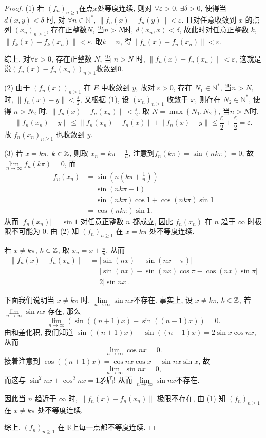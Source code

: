 \begin{proof}
    (1) 若 $(f_n)_{n\geq 1}$在点$x$处等度连续, 则对 $\forall \varepsilon>0$, $\exists \delta>0$, 
    使得当 $d(x,y)<\delta$ 时, 对 $\forall n\in\mathbb{N}^*$, $\|f_n(x)-f_n(y)\|<\varepsilon$. 
    且对任意收敛到 $x$ 的点列 $(x_n)_{n\geq 1}$, 存在正整数$N$, 当$n>N$时, $d(x_n,x)<\delta$, 
    故此时对任意正整数 $k$, $\|f_k(x)-f_k(x_n)\|<\varepsilon$. 取$k=n$, 
    得$\|f_n(x)-f_n(x_n)\|<\varepsilon$.
    
    综上, 对$\forall \varepsilon>0$, 存在正整数 $N$, 当 $n>N$ 时, $\|f_n(x)-f_n(x_n)\|<\varepsilon$, 
    这就是说$(f_n(x)-f_n(x_n))_{n\geq 1}$收敛到$0$.

	(2) 由于 $(f_n(x))_{n\geq 1}$ 在 $E$ 中收敛到 $y$, 故对 $\varepsilon>0$, 存在 $N_1\in\mathbb{N}^*$, 
    当$n>N_1$时, $\|f_n(x)-y\|<\frac{\varepsilon}{2}$, 又根据 (1), 
    设 $(x_n)_{n\geq 1}$ 收敛于 $x$, 则存在 $N_2\in\mathbb{N}^*$, 使得 $n>N_2$ 时, 
    $\|f_n(x)-f_n(x_n)\|<\frac{\varepsilon}{2}$. 取 $N=\max\left\{N_1,N_2\right\}$, 当$n>N$时, 
	\[\|f_n(x_n)-y\|\leq \|f_n(x_n)-f_n(x)\|+\|f_n(x)-y\|\leq\frac{\varepsilon}{2}+\frac{\varepsilon}{2}=\varepsilon.\]
	故 $f_n(x_n)_{n\geq 1}$ 也收敛到 $y$.

	(3) 若 $x=k\pi$, $k\in\mathbb{Z}$, 则取 $x_n=k\pi+\frac{1}{n}$, 注意到$f_n(k\pi)=\sin(nk\pi)=0$, 
    故 $\lim\limits_{n\rightarrow\infty}f_n(k\pi)=0$, 而
    \[\begin{aligned}
		f_n(x_n)&=\sin(n(k\pi+\frac{1}{n}))\\&=\sin(nk\pi+1)\\
		&=\sin(nk\pi)\cos1+\cos(nk\pi)\sin1\\&=\cos(nk\pi)\sin1.
	\end{aligned}\]
    从而 $|f_n(x_n)|=\sin 1$ 对任意正整数 $n$ 都成立, 
    因此 $f_n(x_n)$ 在 $n$ 趋于 $\infty$ 时极限不可能为 $0$. 由 (2) 知 $(f_n)_{n\geq 1}$ 在 $x=k\pi$ 处不等度连续. 

    若 $x\not= k\pi$, $k\in\mathbb{Z}$, 取 $x_n=x+\frac{\pi}{n}$, 从而
    \[\begin{aligned}
    \|f_n(x)-f_n(x_n)\|&=|\sin (nx)-\sin(nx+\pi)|\\
    &=|\sin (nx)-\sin(nx)\cos\pi-\cos(nx)\sin\pi|\\
                    &=2|\sin nx|.
    \end{aligned}\]

    下面我们说明当 $x\not=k\pi$ 时, $\lim\limits_{n\rightarrow \infty}\sin nx$不存在. 
    事实上, 设 $x\not=k\pi$, $k\in\mathbb{Z}$, 若 $\lim\limits_{n\rightarrow \infty} \sin nx$ 存在, 那么
    \[\lim\limits_{n\rightarrow \infty} (\sin((n+1)x)-\sin((n-1)x))=0.\]
    由和差化积, 我们知道 $\sin((n+1)x)-\sin((n-1)x)=2\sin x\cos nx$, 从而
    \[\lim\limits_{n\rightarrow \infty} \cos nx=0.\]
    接着注意到 $\cos((n+1)x)=\cos nx\cos x-\sin nx\sin x$, 故
    \[\lim\limits_{n\rightarrow \infty} \sin nx =0,\]
    而这与 $\sin^2 nx+\cos^2 nx=1$矛盾! 从而 $\lim\limits_{n\rightarrow \infty} \sin nx$不存在.

    因此当 $n$ 趋近于 $\infty$ 时, $\|f_n(x)-f_n(x_n)\|$ 极限不存在, 
    由 (1) 知 $(f_n)_{n\geq 1}$ 在 $x\not= k\pi$ 处不等度连续.
    
    综上, $(f_n)_{n\geq 1}$ 在 $\mathbb{R}$上每一点都不等度连续. 
\end{proof}
